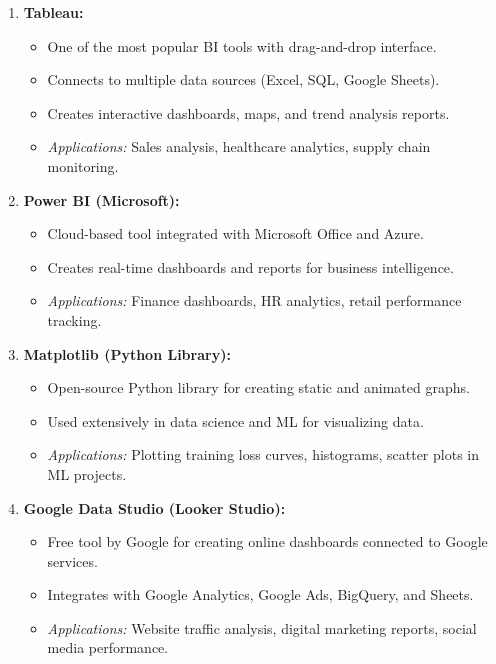 \documentclass[12pt,a4paper]{article}
\newcommand{\term}[1]{\textbf{\color{headingcolor}#1}}
\begin{document}
\begin{answerenv}

\begin{enumerate}[leftmargin=1.8em, itemsep=7pt]
  \item \term{Tableau:}
  \begin{itemize}[leftmargin=1.5em, itemsep=2pt]
    \item One of the most popular BI tools with drag-and-drop interface.
    \item Connects to multiple data sources (Excel, SQL, Google Sheets).
    \item Creates interactive dashboards, maps, and trend analysis reports.
    \item \textit{Applications:} Sales analysis, healthcare analytics, supply chain monitoring.
  \end{itemize}

  \item \term{Power BI (Microsoft):}
  \begin{itemize}[leftmargin=1.5em, itemsep=2pt]
    \item Cloud-based tool integrated with Microsoft Office and Azure.
    \item Creates real-time dashboards and reports for business intelligence.
    \item \textit{Applications:} Finance dashboards, HR analytics, retail performance tracking.
  \end{itemize}

  \item \term{Matplotlib (Python Library):}
  \begin{itemize}[leftmargin=1.5em, itemsep=2pt]
    \item Open-source Python library for creating static and animated graphs.
    \item Used extensively in data science and ML for visualizing data.
    \item \textit{Applications:} Plotting training loss curves, histograms, scatter plots in ML projects.
  \end{itemize}

  \item \term{Google Data Studio (Looker Studio):}
  \begin{itemize}[leftmargin=1.5em, itemsep=2pt]
    \item Free tool by Google for creating online dashboards connected to Google services.
    \item Integrates with Google Analytics, Google Ads, BigQuery, and Sheets.
    \item \textit{Applications:} Website traffic analysis, digital marketing reports, social media performance.
  \end{itemize}
\end{enumerate}

\end{answerenv}
\end{document}
